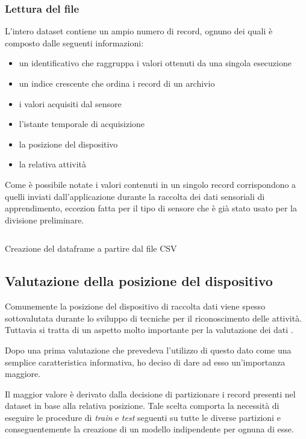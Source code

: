 \subsubsection{Lettura del file}
L'intero dataset contiene un ampio numero di record, ognuno dei quali è composto dalle seguenti informazioni:
\begin{itemize}
    \item un identificativo che raggruppa i valori ottenuti da una singola esecuzione
    \item un indice crescente che ordina i record di un archivio
    \item i valori acquisiti dal sensore
    \item l'istante temporale di acquisizione
    \item la posizione del dispositivo
    \item la relativa attività
\end{itemize}
Come è possibile notate i valori contenuti in un singolo record corrispondono a quelli inviati dall'applicazione durante 
la raccolta dei dati sensoriali di apprendimento,
eccezion fatta per il tipo di sensore che è già stato usato per la divisione preliminare.

\begin{listing}[H] 
    \inputminted[frame=single,framesep=10pt]{python}{assets/snippets/classifier/read_csv.py}
    \caption{Creazione del dataframe a partire dal file CSV}
\end{listing}


\subsection{Valutazione della posizione del dispositivo}
Comunemente la posizione del dispositivo di raccolta dati viene spesso sottovalutata durante lo sviluppo di tecniche 
per il riconoscimento delle attività. Tuttavia si tratta di un aspetto molto importante per la valutazione dei dati \cite{umafall}.

Dopo una prima valutazione che prevedeva l'utilizzo di questo dato come una semplice caratteristica informativa, ho deciso 
di dare ad esso un'importanza maggiore. 

Il maggior valore è derivato dalla decisione di partizionare i record presenti nel dataset in base alla relativa posizione. 
Tale scelta comporta la necessità di eseguire le procedure di \textit{train} e \textit{test} seguenti su tutte le diverse partizioni 
e conseguentemente la creazione di un modello indipendente per ognuna di esse.

